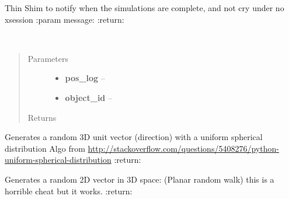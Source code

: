 \documentclass[letterpaper,10pt,english]{sphinxmanual}
\begin{document}

\begin{fulllineitems}
\label{index:aietes.Tools.notify_desktop}
Thin Shim to notify when the simulations are complete, and not cry under no xsession
:param message:
:return:

\end{fulllineitems}


\begin{fulllineitems}
\label{index:aietes.Tools.object_log}~\begin{quote}\begin{description}
\item[{Parameters}] \leavevmode\begin{itemize}
\item {} 
\textbf{pos\_log} -- 

\item {} 
\textbf{object\_id} -- 

\end{itemize}

\item[{Returns}] \leavevmode


\end{description}\end{quote}

\end{fulllineitems}


\begin{fulllineitems}
\label{index:aietes.Tools.random_three_vector}
Generates a random 3D unit vector (direction) with a uniform spherical distribution
Algo from \href{http://stackoverflow.com/questions/5408276/python-uniform-spherical-distribution}{http://stackoverflow.com/questions/5408276/python-uniform-spherical-distribution}
:return:

\end{fulllineitems}


\begin{fulllineitems}
\label{index:aietes.Tools.random_xy_vector}
Generates a random 2D vector in 3D space: (Planar random walk)
this is a horrible cheat but it works.
:return:

\end{fulllineitems}
\end{document}
